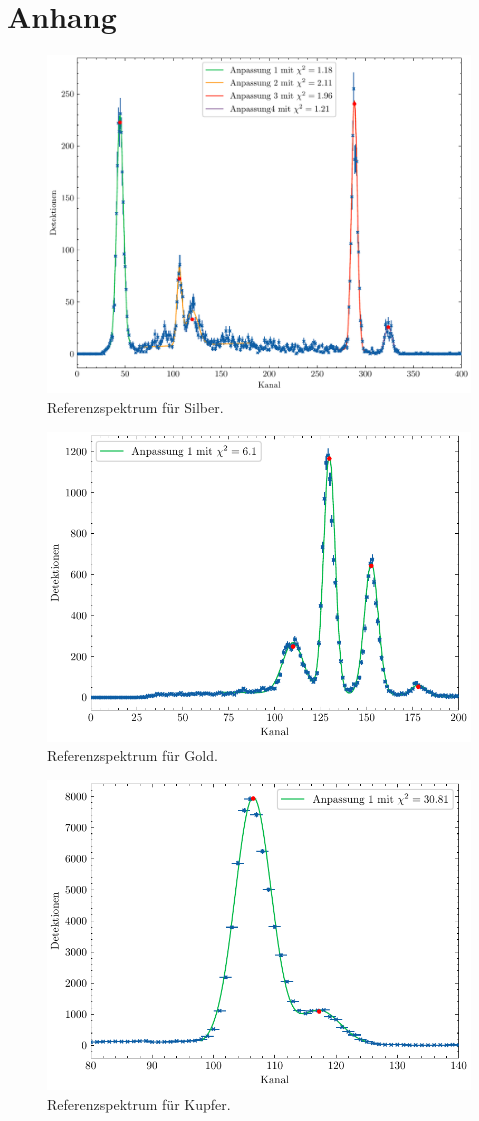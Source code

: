 \section*{Anhang}\label{sec:anhang}
\begin{figure}[H]
	\centering
	\includegraphics[width=0.6\linewidth]{../figs/Ag1.pdf}
	\caption{Referenzspektrum für Silber.}
	\label{fig:ag1}
\end{figure}
\begin{figure}[H]
	\centering
	\includegraphics[width=0.6\linewidth]{../figs/Au.pdf}
	\caption{Referenzspektrum für Gold.}
	\label{fig:au}
\end{figure}
\begin{figure}[H]
	\centering
	\includegraphics[width=0.6\linewidth]{../figs/Cu.pdf}
	\caption{Referenzspektrum für Kupfer.}
	\label{fig:cu}
\end{figure}
